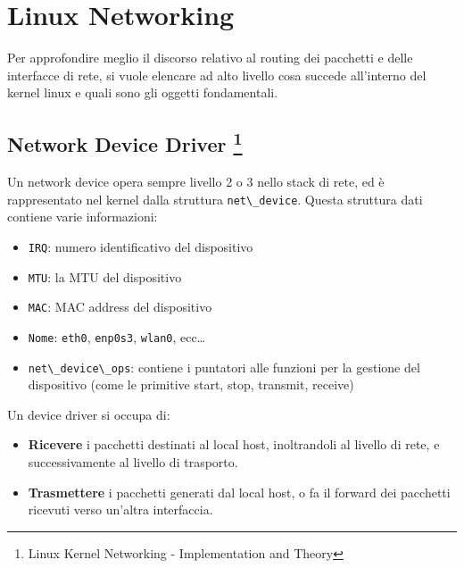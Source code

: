 \section{Linux Networking}\label{linux-networking}

Per approfondire meglio il discorso relativo al routing dei pacchetti e
delle interfacce di rete, si vuole elencare ad alto livello cosa succede
all'interno del kernel linux e quali sono gli oggetti fondamentali.

\subsection[Network Device Driver ]{\texorpdfstring{Network Device
Driver \footnote{\label{fn:ref_23}Linux Kernel Networking - Implementation and Theory}
}{Network Device Driver  }}\label{network-device-driver-1}

Un network device opera sempre livello 2 o 3 nello stack di rete, ed è
rappresentato nel kernel dalla struttura
\passthrough{\lstinline!net\_device!}. Questa struttura dati contiene
varie informazioni:

\begin{itemize}
\tightlist
\item
  \passthrough{\lstinline!IRQ!}: numero identificativo del dispositivo
\item
  \passthrough{\lstinline!MTU!}: la MTU del dispositivo
\item
  \passthrough{\lstinline!MAC!}: MAC address del dispositivo
\item
  \passthrough{\lstinline!Nome!}: \passthrough{\lstinline!eth0!},
  \passthrough{\lstinline!enp0s3!}, \passthrough{\lstinline!wlan0!},
  ecc\ldots{}
\item
  \passthrough{\lstinline!net\_device\_ops!}: contiene i puntatori alle
  funzioni per la gestione del dispositivo (come le primitive start,
  stop, transmit, receive)
\end{itemize}

Un device driver si occupa di:

\begin{itemize}
\tightlist
\item
  \textbf{Ricevere} i pacchetti destinati al local host, inoltrandoli al
  livello di rete, e successivamente al livello di trasporto.
\item
  \textbf{Trasmettere} i pacchetti generati dal local host, o fa il
  forward dei pacchetti ricevuti verso un'altra interfaccia.
\end{itemize}

